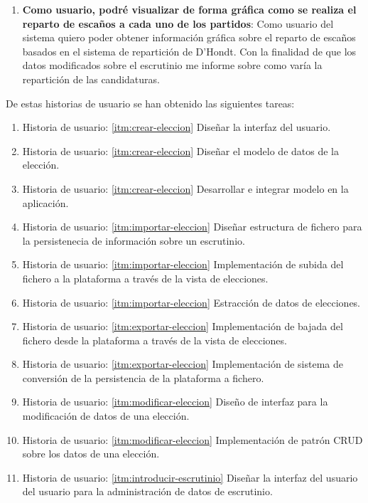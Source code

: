 \documentclass{article}
\begin{document}
\begin{enumerate}[label=HU-\arabic*]
            \item\label{itm:visualizar-grafica-escanos} \textbf{\large Como usuario, podré visualizar de forma gráfica como se realiza el reparto de escaños a cada uno de los partidos}: Como usuario del sistema quiero poder obtener información gráfica sobre el reparto de escaños basados en el sistema de repartición de D'Hondt. Con la finalidad de que los datos modificados sobre el escrutinio me informe sobre como varía la repartición de las candidaturas.
        \end{enumerate}
        
        De estas historias de usuario se han obtenido las siguientes tareas:
        \begin{enumerate}
        \item Historia de usuario: \ref{itm:crear-eleccion} Diseñar la interfaz del usuario.
        \item Historia de usuario: \ref{itm:crear-eleccion} Diseñar el modelo de datos de la elección.
        \item Historia de usuario: \ref{itm:crear-eleccion} Desarrollar e integrar modelo en la aplicación.
        \item Historia de usuario: \ref{itm:importar-eleccion} Diseñar estructura de fichero para la persistenecia de información sobre un escrutinio.
        \item Historia de usuario: \ref{itm:importar-eleccion} Implementación de subida del fichero a la plataforma a través de la vista de elecciones.
        \item Historia de usuario: \ref{itm:importar-eleccion} Estracción de datos de elecciones.
        \item Historia de usuario: \ref{itm:exportar-eleccion} Implementación de bajada del fichero desde la plataforma a través de la vista de elecciones.
        \item Historia de usuario: \ref{itm:exportar-eleccion} Implementación de sistema de conversión de la persistencia de la plataforma a fichero.
        \item Historia de usuario: \ref{itm:modificar-eleccion} Diseño de interfaz para la modificación de datos de una elección.
        \item Historia de usuario: \ref{itm:modificar-eleccion} Implementación de patrón CRUD sobre los datos de una elección.
        \item Historia de usuario: \ref{itm:introducir-escrutinio} Diseñar la interfaz del usuario del usuario para la administración de datos de escrutinio.

\end{enumerate}
\end{document}
